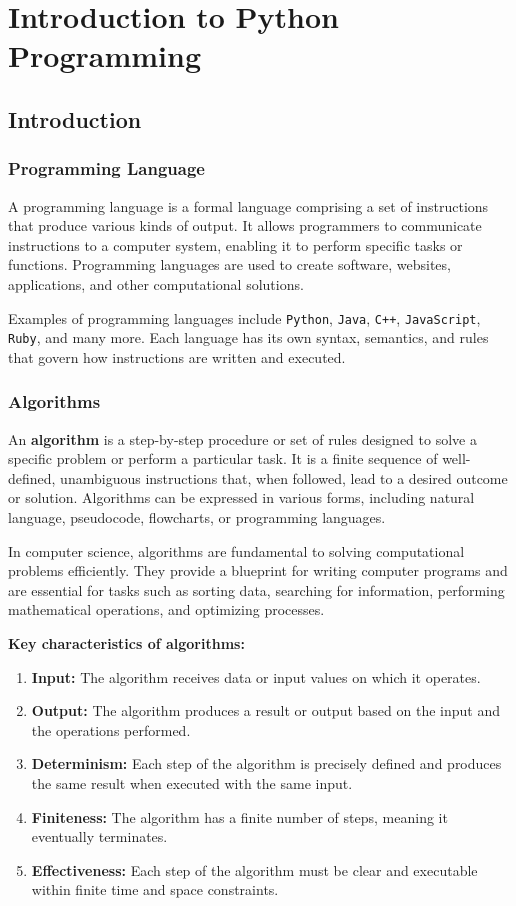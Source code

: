 \chapter{Introduction to Python Programming}

\section{Introduction}

\subsection{Programming Language}
A programming language is a formal language comprising a set of instructions that produce various kinds of output. It allows programmers to communicate instructions to a computer system, enabling it to perform specific tasks or functions. Programming languages are used to create software, websites, applications, and other computational solutions.

Examples of programming languages include \texttt{Python}, \texttt{Java}, \texttt{C++}, \texttt{JavaScript}, \texttt{Ruby}, and many more. Each language has its own syntax, semantics, and rules that govern how instructions are written and executed.

\subsection{Algorithms}
An \textbf{algorithm} is a step-by-step procedure or set of rules designed to solve a specific problem or perform a particular task. It is a finite sequence of well-defined, unambiguous instructions that, when followed, lead to a desired outcome or solution. Algorithms can be expressed in various forms, including natural language, pseudocode, flowcharts, or programming languages.

In computer science, algorithms are fundamental to solving computational problems efficiently. They provide a blueprint for writing computer programs and are essential for tasks such as sorting data, searching for information, performing mathematical operations, and optimizing processes.

\textbf{Key characteristics of algorithms:}
\begin{enumerate}
    \item \textbf{Input:} The algorithm receives data or input values on which it operates.
    \item \textbf{Output:} The algorithm produces a result or output based on the input and the operations performed.
    \item \textbf{Determinism:} Each step of the algorithm is precisely defined and produces the same result when executed with the same input.
    \item \textbf{Finiteness:} The algorithm has a finite number of steps, meaning it eventually terminates.
    \item \textbf{Effectiveness:} Each step of the algorithm must be clear and executable within finite time and space constraints.
\end{enumerate}


